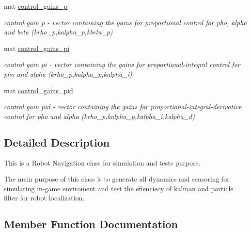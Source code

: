 \begin{DoxyCompactItemize}
mat \hyperlink{class_robot_navigation_ad7ff88f46b33d23be62fc365b650361e}{control\+\_\+gains\+\_\+p}
\begin{DoxyCompactList}\small\item\em control gain p -\/ vector containing the gains for proportional control for pho, alpha and beta (krho\+\_\+p,kalpha\+\_\+p,kbeta\+\_\+p) \end{DoxyCompactList}\item 
\mbox{\label{class_robot_navigation_a90738c7f4f1a884edce67e44769b284b}} 
mat \hyperlink{class_robot_navigation_a90738c7f4f1a884edce67e44769b284b}{control\+\_\+gains\+\_\+pi}
\begin{DoxyCompactList}\small\item\em control gain pi -\/ vector containing the gains for proportional-\/integral control for pho and alpha (krho\+\_\+p,kalpha\+\_\+p,kalpha\+\_\+i) \end{DoxyCompactList}\item 
\mbox{\label{class_robot_navigation_a0f450c83221af7ef3e276b65ebfdc50d}} 
mat \hyperlink{class_robot_navigation_a0f450c83221af7ef3e276b65ebfdc50d}{control\+\_\+gains\+\_\+pid}
\begin{DoxyCompactList}\small\item\em control gain pid -\/ vector containing the gains for proportional-\/integral-\/derivative control for pho and alpha (krho\+\_\+p,kalpha\+\_\+p,kalpha\+\_\+i,kalpha\+\_\+d) \end{DoxyCompactList}\end{DoxyCompactItemize}


\subsection{Detailed Description}
This is a Robot Navigation class for simulation and tests purpose. 

The main purpose of this class is to generate all dynamics and sensoring for simulating in-\/game enviroment and test the efienciecy of kalman and particle filter for robot localization. 

\subsection{Member Function Documentation}
\mbox{\label{class_robot_navigation_a0ca549632dc878d276ab2da06e5ed41b}} 
